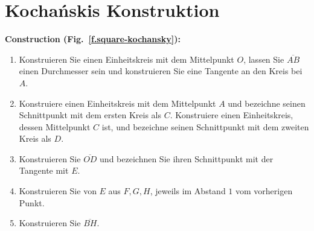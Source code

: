 
\section{Kocha\'{n}skis Konstruktion}\label{s.square-kochanski}
\textbf{Construction (Fig.~\ref{f.square-kochansky}):}
\begin{enumerate}
\item Konstruieren Sie einen Einheitskreis mit dem Mittelpunkt $O$, lassen Sie $\overline{AB}$ einen Durchmesser sein und konstruieren Sie eine Tangente an den Kreis bei $A$.
\item Konstruiere einen Einheitskreis mit dem Mittelpunkt $A$ und bezeichne seinen Schnittpunkt mit dem ersten Kreis als $C$. Konstruiere einen Einheitskreis, dessen Mittelpunkt $C$ ist, und bezeichne seinen Schnittpunkt mit dem zweiten Kreis als $D$. 
\item Konstruieren Sie $\overline{OD}$ und bezeichnen Sie ihren Schnittpunkt mit der Tangente mit $E$.
\item Konstruieren Sie von $E$ aus $F,G,H$, jeweils im Abstand $1$ vom vorherigen Punkt.
\item Konstruieren Sie $\overline{BH}$.
\end{enumerate}

